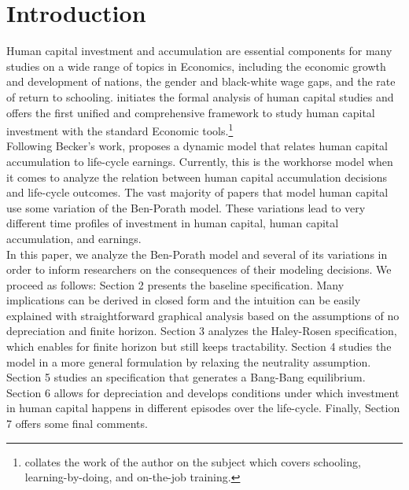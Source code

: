 \section{Introduction}
\noindent Human capital investment and accumulation are essential components for many studies on a wide range of topics in Economics, including the economic growth and development of nations, the gender and black-white wage gaps, and the rate of return to schooling. \citet{becker1962investment} initiates the formal analysis of human capital studies and offers the first unified and comprehensive framework to study human capital investment with the standard Economic tools.\footnote{\citet{becker2009human} collates the work of the author on the subject which covers schooling, learning-by-doing, and on-the-job training.} \\
\indent Following Becker's work, \citet{ben1967production} proposes a dynamic model that relates human capital accumulation to life-cycle earnings. Currently, this is the workhorse model when it comes to analyze the relation between human capital accumulation decisions and life-cycle outcomes. The vast majority of papers that model human capital use some variation of the Ben-Porath model. These variations lead to very different time profiles of investment in human capital, human capital accumulation, and earnings.\\
\indent In this paper, we analyze the Ben-Porath model and several of its variations in order to inform researchers on the consequences of their modeling decisions. We proceed as follows: Section 2 presents the baseline specification. Many implications can be derived in closed form and the intuition can be easily explained with straightforward graphical analysis based on the assumptions of no depreciation and finite horizon. Section 3 analyzes the Haley-Rosen specification, which enables for finite horizon but still keeps tractability. Section 4 studies the model in a more general formulation by relaxing the neutrality assumption. Section 5 studies an specification that generates a Bang-Bang equilibrium. Section 6 allows for depreciation and develops conditions under which investment in human capital happens in different episodes over the life-cycle. Finally, Section 7 offers some final comments. \\